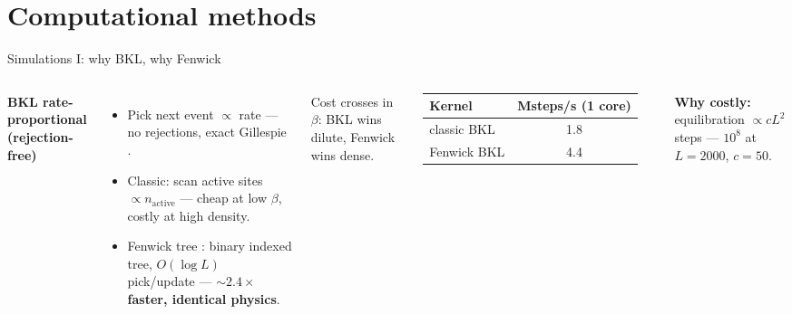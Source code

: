 \documentclass[aspectratio=169,10pt]{beamer}
\newcommand{\pos}[1]{\textcolor{positive}{#1}}
\newcommand{\con}[1]{\textcolor{negative}{#1}}
\begin{document}
\section{Computational methods}
\begin{frame}{Simulations I: why BKL, why Fenwick}
  \begin{columns}[T]
      \textbf{BKL rate-proportional (rejection-free)}
      \begin{itemize}
        \item Pick next event $\propto$ rate — no rejections, exact Gillespie \cite{bkl1975}.
        \item Classic: scan active sites $\propto n_{\mathrm{active}}$ — cheap at low $\beta$, \con{costly at high density}.
        \item \pos{Fenwick tree} \cite{fenwick1994}: binary indexed tree, $O(\log L)$ pick/update — \textbf{${\sim}2.4\times$ faster, identical physics}.
      \end{itemize}
      \vspace{0.3em}
      {\small Cost crosses in $\beta$: BKL wins dilute, Fenwick wins dense.}
      \centering
      \begin{tabular}{lc}
        \toprule
        Kernel & Msteps/s (1 core) \\
        \midrule
        classic BKL & 1.8 \\
        Fenwick BKL & 4.4 \\
        \bottomrule
      \end{tabular}
      \vspace{0.6em}

      {\small \textbf{Why costly:} equilibration $\propto cL^2$ steps — $10^8$ at $L=2000$, $c=50$.}
  \end{columns}
\end{frame}
\end{document}

